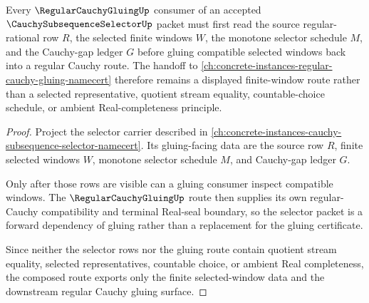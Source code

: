 \begin{theorem}
\label{thm:cauchy-subsequence-selector-regular-cauchy-gluing-forward-route}
Every $\RegularCauchyGluingUp$ consumer of an accepted $\CauchySubsequenceSelectorUp$ packet must first read the source regular-rational row $R$, the selected finite windows $W$, the monotone selector schedule $M$, and the Cauchy-gap ledger $G$ before gluing compatible selected windows back into a regular Cauchy route. The handoff to \autoref{ch:concrete-instances-regular-cauchy-gluing-namecert} therefore remains a displayed finite-window route rather than a selected representative, quotient stream equality, countable-choice schedule, or ambient Real-completeness principle.
\end{theorem}
\begin{proof}
Project the selector carrier described in \autoref{ch:concrete-instances-cauchy-subsequence-selector-namecert}. Its gluing-facing data are the source row $R$, finite selected windows $W$, monotone selector schedule $M$, and Cauchy-gap ledger $G$.

Only after those rows are visible can a gluing consumer inspect compatible windows. The $\RegularCauchyGluingUp$ route then supplies its own regular-Cauchy compatibility and terminal Real-seal boundary, so the selector packet is a forward dependency of gluing rather than a replacement for the gluing certificate.

Since neither the selector rows nor the gluing route contain quotient stream equality, selected representatives, countable choice, or ambient Real completeness, the composed route exports only the finite selected-window data and the downstream regular Cauchy gluing surface.
\end{proof}
